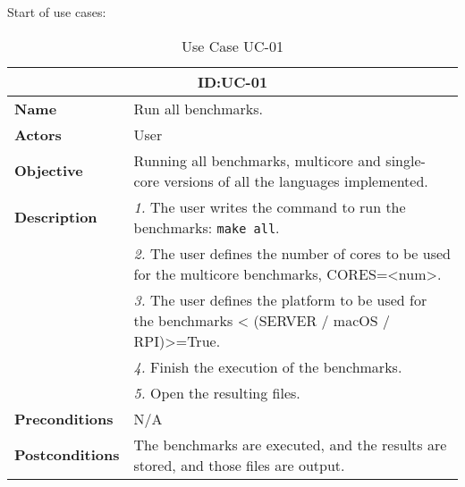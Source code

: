 Start of use cases:
\begin{table}[H]
    \centering
    \begin{tabular}{l p{10cm}}
        \toprule
        \multicolumn{2}{c}{\textbf{ID:\@ UC-01}} \\
        \toprule
        \textbf{Name}                         &  Run all benchmarks. \\
        \textbf{Actors}                       &  User \\
        \textbf{Objective}                    &  Running all benchmarks, multicore and single-core versions of all the languages implemented. \\
        \multirow{1}{*}{\textbf{Description}} & \textsl{1.} The user writes the command to run the benchmarks: \texttt{make all}.\\
                                              & \textsl{2.} The user defines the number of cores to be used for the multicore benchmarks, CORES=<num>.\\
                                              & \textsl{3.} The user defines the platform to be used for the benchmarks < (SERVER / macOS / RPI)>=True.\\
                                              & \textsl{4.} Finish the execution of the benchmarks.\\
                                              & \textsl{5.} Open the resulting files.\\
        \textbf{Preconditions}                &  N/A \\
        \textbf{Postconditions}               &  The benchmarks are executed, and the results are stored, and those files are output. \\
    \end{tabular}
    \caption{Use Case UC-01}\label{tab:uc-01}
\end{table}

